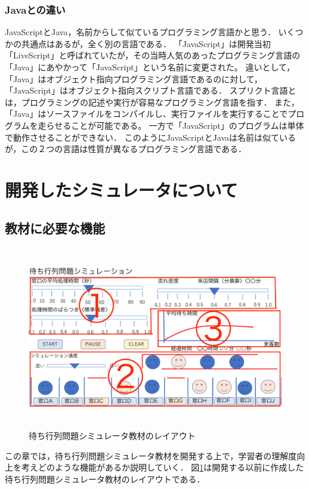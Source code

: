 \documentclass[12pt,a4j]{ltjsarticle}
\begin{document}
\subsubsection{Javaとの違い}
JavaScriptとJava，名前からして似ているプログラミング言語かと思う．
いくつかの共通点はあるが，全く別の言語である．
「JavaScript」は開発当初「LiveScript」と呼ばれていたが，その当時人気のあったプログラミング言語の「Java」にあやかって「JavaScript」という名前に変更された。
違いとして，「Java」はオブジェクト指向プログラミング言語であるのに対して，「JavaScript」はオブジェクト指向スクリプト言語である．
スプリクト言語とは，プログラミングの記述や実行が容易なプログラミング言語を指す．
また，「Java」はソースファイルをコンパイルし、実行ファイルを実行することでプログラムを走らせることが可能である。
一方で「JavaScript」のプログラムは単体で動作させることができない．
このようにJavaScriptとJavaは名前は似ているが，この２つの言語は性質が異なるプログラミング言語である．
\clearpage

\section{開発したシミュレータについて}
\subsection{教材に必要な機能} 
\begin{figure}[h]
\begin{center}
\includegraphics[height = 80mm ]{figures/simulator_layout.pdf}
\caption{待ち行列問題シミュレータ教材のレイアウト}
\end{center}
\label{fig:layout}
\end{figure}
この章では，待ち行列問題シミュレータ教材を開発する上で，学習者の理解度向上を考えどのような機能があるか説明していく．
図\ref{fig:layout}は開発する以前に作成した待ち行列問題シミュレータ教材のレイアウトである．
\end{document}
